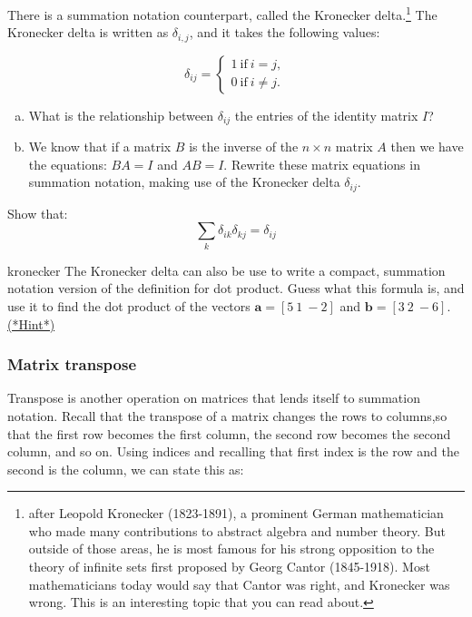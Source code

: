 There is a summation notation counterpart, called the {\bfi Kronecker delta}.\footnote{after Leopold Kronecker (1823-1891), a prominent German mathematician who made many contributions to abstract algebra and number theory. But outside of those areas, he is most famous for his strong opposition to the theory of infinite sets first proposed by Georg Cantor (1845-1918).  Most mathematicians today would say that Cantor was right, and Kronecker was wrong. This is an interesting topic that you can read about.} The Kronecker delta is written as $\delta_{i,j}$, and it takes the following values:

\[ \delta_{ij}=
\begin{cases}
1 ~ \text{if} ~ i=j,  \\
0 ~ \text{if} ~ i \neq j.
\end{cases} \]

\begin{exercise}{}
\begin{enumerate}[(a)]
\item
What is the relationship between $\delta_{ij}$ the entries of the identity matrix $I$?
\item
We know that if a matrix $B$ is the inverse of the $n \times n$ matrix $A$ then we have the equations: $BA = I$ and $AB = I$.  Rewrite these matrix equations in summation notation, making use of the Kronecker delta $\delta_{ij}$.
\end{enumerate}
\end{exercise}

\begin{exercise}{}
Show that:
\[ \sum_k  \delta_{ik}\delta_{kj}=\delta_{ij}\]
\end{exercise}

\begin{exercise}{kronecker}
The Kronecker delta can also be use to write a compact, summation notation version of the definition for dot product.  Guess what this formula is, and use it to find the dot product of the vectors $\textbf{a}=[5~1~-2]$ and $\textbf{b}=[3~2~-6]$.
\hyperref[sec:sigma:hints]{(*Hint*)} 
\end{exercise}

\subsubsection*{Matrix transpose}
Transpose is another operation on matrices that lends itself to summation notation.  Recall that the transpose of a matrix changes the rows to columns,so that the first row becomes the first column, the second row becomes the second column, and so on.   Using indices and recalling that first index is the row and the second is the column, we can state this as:

